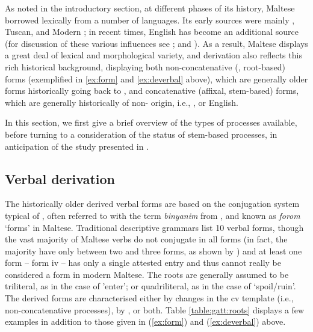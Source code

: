 \documentclass[output=paper]{LSP/langsci}
\begin{document}
As noted in the introductory section, at different phases of its history, Maltese borrowed lexically from a number of languages. 
Its early sources were mainly , Tuscan, and Modern ; in recent times, English has become an additional source (for discussion of these various influences see \citealt{Mifsud1995productivity,BorgAlexander1997,Fabri2013,Spagnol2013}; and \citealt{BrincatMifsud2016}). 
As a result, Maltese displays a great deal of lexical and morphological variety, and derivation also reflects this rich historical background, displaying both non-concatenative (, root-based) forms (exemplified in \ref{ex:form} and \ref{ex:deverbal} above), which are generally older forms historically going back to , and concatenative (affixal, stem-based) forms, which are generally historically of non- origin, i.e., ,  or English. 

In this section, we first give a brief overview of the types of  processes available, before turning to a consideration of the status of stem-based  processes, in anticipation of the study presented in .

\subsection{Verbal derivation}\label{sec:verbal}
The historically older derived verbal forms are based on the conjugation system typical of , often referred to with the term \textit{binyanim} from , and known as \textit{forom} `forms' in Maltese. Traditional descriptive grammars list 10  verbal forms, though the vast majority of Maltese verbs do not conjugate in all forms (in fact, the majority have only between two and three forms, as shown by \citealt{Spagnol2013}) and at least one form -- form {\sc iv} -- has only a single attested entry and thus cannot really be considered a  form in modern Maltese. The roots are generally assumed to be triliteral, as in the case of  'enter'; or quadriliteral, as in the case of  `spoil/ruin'. 
The derived forms are characterised either by changes in the {\sc cv} template (i.e., non-concatenative processes), by , or both. Table \ref{table:gatt:roots} displays a few examples in addition to those given in (\ref{ex:form}) and (\ref{ex:deverbal}) above.
\end{document}
